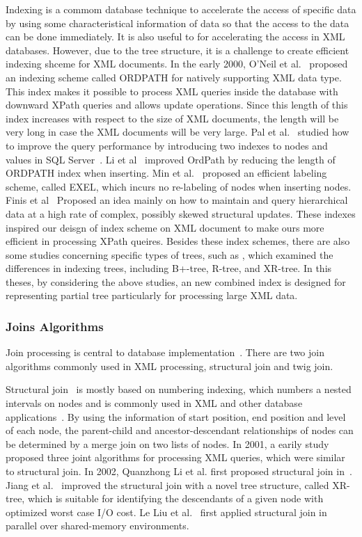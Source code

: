Indexing is a commom database technique to accelerate the access of specific
data by using some characteristical information of data so that the access to
the data can be done immediately. It is also useful to for accelerating the
access in XML databases. However, due to the tree structure, it is a challenge
to create efficient indexing shceme for XML documents. In the early 2000, O'Neil
et al.~\cite{OOPC04} proposed an indexing scheme called ORDPATH for natively
supporting XML data type. This index makes it possible to process XML queries
inside the database with downward XPath queries and allows update operations.
Since this length of this index increases with respect to the size of XML
documents, the length will be very long in case the XML documents will be very
large. Pal et al.~\cite{PCSS04} studied how to improve the query performance by
introducing two indexes to nodes and values in SQL Server~\cite{sql2005}. Li et
al~\cite{LiLi05} improved OrdPath by reducing the length of ORDPATH index when
inserting. Min et al.~\cite{MLCh07} proposed an efficient labeling scheme,
called EXEL, which incurs no re-labeling of nodes when inserting nodes. Finis et
al~\cite{FBKF15} Proposed an idea mainly on how to maintain and query
hierarchical data at a high rate of complex, possibly skewed structural updates.
These indexes inspired our deisgn of index scheme on XML document to make ours
more efficient in processing XPath queires. Besides these index schemes, there
are also some studies concerning specific types of trees, such as
\cite{ToGr02,JLWO03,CVZZ08}, which examined the differences in indexing trees,
including B+-tree, R-tree, and XR-tree. In this theses, by considering the above
studies, an new combined index is designed for representing partial tree
particularly for processing large XML data.

\subsubsection{Joins Algorithms}

Join processing is central to database implementation~\cite{graefe1993query}.
There are two join algorithms commonly used in XML processing, structural join
and twig join.

Structural join~\cite{AlJYK02} is mostly based on numbering
indexing\cite{numbering}, which numbers a nested intervals on nodes and is
commonly used in XML and other database
applications~\cite{ZNDI01,HAJR03,ZNDI01}. By using the information of start
position, end position and level of each node, the parent-child and
ancestor-descendant relationships of nodes can be determined by a merge join on
two lists of nodes. In 2001, a earily study~\cite{LiMo01} proposed three joint
algorithms for processing XML queries, which were similar to structural join. In
2002, Quanzhong Li et al. first proposed structural join in~\cite{AlJYK02}.
Jiang et al.~\cite{JLWO03} improved the structural join with a novel tree
structure, called XR-tree, which is suitable for identifying the descendants of
a given node with optimized worst case I/O cost. Le Liu et al.~\cite{LFLQ08}
first applied structural join in parallel over shared-memory environments.

